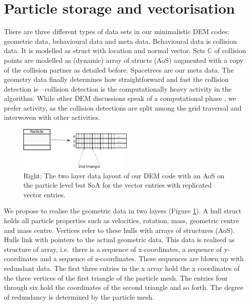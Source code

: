 \section{Particle storage and vectorisation}
\label{section:vectorisation}

There are three different types of data sets in our minimalistic DEM codes: 
geometric data, behavioural data and meta data. 
Behavioural data is collision data.
It is modelled as struct with location and normal vector.
Sets $\mathbb{C}$ of collision points are modelled as (dynamic) array of structs
(AoS) augmented with a copy of the collision partner as detailed before.
Spacetrees are our meta data.
The geometry data finally determines how straightforward and fast the collision
detection is---collision detection is the computationally heavy activity in the
algorithm.
While other DEM discussions speak of a computational phase \cite{xxxx}, we
prefer activity, as the collision detections are split among the grid traversal
and interwoven with other activities.


\begin{figure}
 \begin{center}
  \includegraphics[width=0.5\textwidth]{sketches/data-structure.pdf}
 \end{center}
 \caption{
   Right: The two layer data layout of our DEM code with an AoS on the particle
   level but SoA for the vector entries with replicated vector entries.
 }
 \label{figure:data-structure}
\end{figure}


We propose to realise the geometric data in two layers (Figure
\ref{figure:data-structure}).
A hull struct holds all particle properties such as velocities, rotation, mass,
geometric centre and mass centre.
Vertices refer to these hulls with arrays of structures (AoS).
Hulls link with pointers to the actual geometric data. 
This data is realised as structure of array, i.e.~there is a sequence of
x-coordinates, a sequence of y-coordinates and a sequence of z-coordinates.
These sequences are blown up with redundant data.
The first three entries in the x array hold the x coordinates of the three
vertices of the first triangle of the particle mesh.
The entries four through six hold the coordinates of the second triangle and so
forth. 
The degree of redundancy is determined by the particle mesh.


